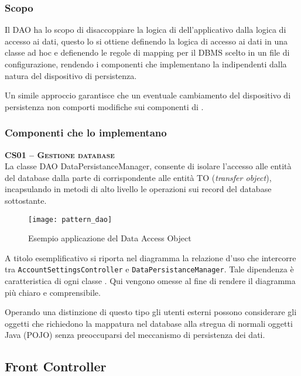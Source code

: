 \subsubsection{Scopo}
Il  DAO ha lo scopo di disaccoppiare la logica di  dell'applicativo dalla logica di accesso ai dati, questo lo si ottiene definendo la logica di accesso ai dati in una classe ad hoc e defienendo le regole di mapping per il DBMS scelto in un file di configurazione, rendendo i componenti che implementano la  indipendenti dalla natura del dispositivo di persistenza.

Un simile approccio garantisce che un eventuale cambiamento del dispositivo di persistenza non comporti modifiche sui componenti di .

\subsubsection{Componenti che lo implementano}
\begin{description}
\item{\scshape\bfseries CS01 -- Gestione database}\\
La classe DAO DataPersistanceManager, consente di isolare l'accesso alle entità del database dalla parte di  corrispondente alle entità TO (\textit{transfer object}), incapsulando in metodi di alto livello le operazioni sui record del database sottostante.

\begin{figure}[H]
  \centering
  \texttt{[image: pattern\_dao]}
  \caption{Esempio applicazione del  Data Access Object}\label{fig:dao}
\end{figure}

A titolo esemplificativo si riporta nel diagramma la relazione d'uso che intercorre tra \texttt{AccountSettingsController} e \texttt{DataPersistanceManager}. Tale dipendenza è caratteristica di ogni classe . Qui vengono omesse al fine di rendere il diagramma più chiaro e comprensibile.

Operando una distinzione di questo tipo gli utenti esterni possono considerare gli oggetti che richiedono la mappatura nel database alla stregua di normali oggetti Java (POJO) senza preoccuparsi del meccanismo di persistenza dei dati.
\end{description}

\subsection{Front Controller}\label{sec:patternfacade}

